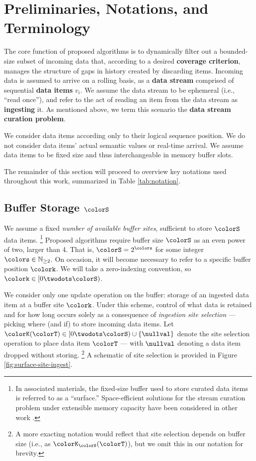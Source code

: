 \section{Preliminaries, Notations, and Terminology} \label{sec:notation}

The core function of proposed algorithms is to dynamically filter out a bounded-size subset of incoming data that, according to a desired \textbf{coverage criterion}, manages the structure of gaps in history created by discarding items.
Incoming data is assumed to arrive on a rolling basis, as a \textbf{data stream} comprised of sequential \textbf{data items} $v_i$.
We assume the data stream to be ephemeral (i.e., ``read once''), and refer to the act of reading an item from the data stream as \textbf{ingesting} it.
As mentioned above, we term this scenario the \textbf{data stream curation problem}.

We consider data items according only to their logical sequence position.
We do not consider data items' actual semantic values or real-time arrival.
We assume data items to be fixed size and thus interchangeable in memory buffer slots.

The remainder of this section will proceed to overview key notations used throughout this work, summarized in Table \ref{tab:notation}.



\subsection{Buffer Storage $\colorS$}
\label{sec:notation-buffer}

We assume a fixed \textit{number of available buffer sites}, sufficient to store $\colorS$ data items.%
\footnote{%
In associated materials, the fixed-size buffer used to store curated data items is referred to as a ``surface.''
Space-efficient solutions for the stream curation problem under extensible memory capacity have been considered in other work \citep{moreno2024algorithms}.%
}
Proposed algorithms require buffer size $\colorS$ as an even power of two, larger than 4. That is, $\colorS = 2^{\colors}$ for some integer $\colors \in \mathbb{N}_{\geq 2}$.
On occasion, it will become necessary to refer to a specific buffer position $\colork$.
We will take a zero-indexing convention, so $\colork \in [0\twodots\colorS)$.

We consider only one update operation on the buffer: storage of an ingested data item at a buffer site $\colork$.
Under this scheme, control of what data is retained and for how long occurs solely as a consequence of \textit{ingestion site selection} --- picking where (and if) to store incoming data items.
Let $\colorK(\colorT) \in [0\twodots\colorS)\cup\{\nullval\}$ denote the site selection operation to place data item $\colorT$ --- with $\nullval$ denoting a data item dropped without storing.%
\footnote{%
A more exacting notation would reflect that site selection depends on buffer size (i.e., as $\colorK_{\colorS}(\colorT)$), but we omit this in our notation for brevity.
}
A schematic of site selection is provided in Figure \ref{fig:surface-site-ingest}.

